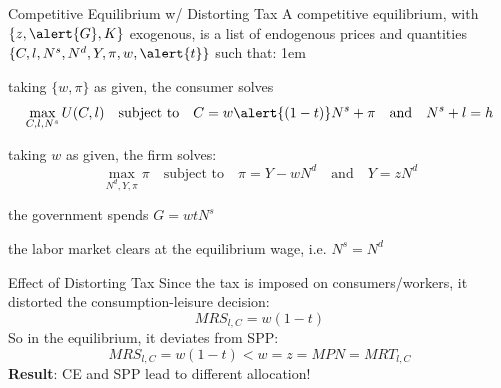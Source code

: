 \documentclass[11pt,aspectratio=43]{beamer}
\let\oldenumerate=\enumerate
\let\endoldenumerate=\endenumerate
\renewenvironment{enumerate}{\oldenumerate \itemsep1em}{ \endoldenumerate}
\theoremstyle{definition}
\begin{document}
\begin{frame}{Competitive Equilibrium w/ Distorting Tax}
\label{slide:Competitive_Equilibrium_w__Distortionary_Tax}
    A competitive equilibrium, with $ \{ z, \alert{G}, K \} $ exogenous, is a list of endogenous prices and quantities $ \{ C, l, N^{s}, N^{d}, Y, \pi, w, \alert{t} \} $ such that:
    \begin{enumerate}
        \item  taking $ \{ w, \pi \} $ as given, the consumer solves
        \begin{equation*}
            \max_{C, l, N^{s}} U( C, l )
            \quad \text{subject to} \quad
            C = w\alert{( 1-t )}N^{s} + \pi
            \quad \text{and} \quad
            N^{s} + l = h
        \end{equation*}
        \item taking $ w $ as given, the firm solves:
        \begin{equation*}
            \max_{N^{d}, Y, \pi} \pi
            \quad \text{subject to} \quad
            \pi = Y - w N^{d}
            \quad \text{and} \quad
            Y = z N^{d}
        \end{equation*}
        \item the government spends $ G = w t N^{s} $
        \item the labor market clears at the equilibrium wage, i.e. $ N^{s} = N^{d} $
    \end{enumerate}
\end{frame}

\begin{frame}{Effect of Distorting Tax}
\label{slide:Effect_of_Distorting_Tax}
    Since the tax is imposed on consumers/workers, it distorted the consumption-leisure decision:
    \begin{equation*}
        MRS_{l, C} = w( 1-t )
    \end{equation*}
    So in the equilibrium, it deviates from SPP:
    \begin{equation*}
        MRS_{l, C} = w( 1-t ) < w = z = MPN = MRT_{l, C}
    \end{equation*}
    \textbf{Result}: CE and SPP lead to different allocation!
\end{frame}
\end{document}
